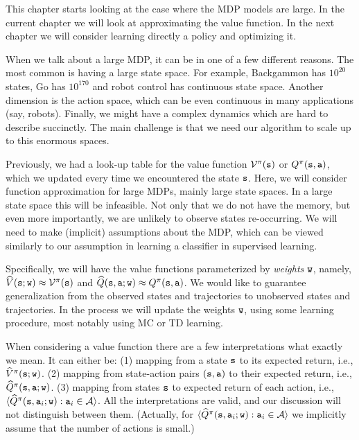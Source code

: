 This chapter starts looking at the case where the MDP models are
large. In the current chapter we will look at approximating the
value function. In the next chapter we will consider learning
directly a policy and optimizing it.

When we talk about a large MDP, it can be in one of a few different
reasons. The most common is having a large state space. For example,
Backgammon has $10^{20}$ states, Go has $10^{170}$ and robot control
has continuous state space. Another dimension is the action space,
which can be even continuous in many applications (say, robots).
Finally, we might have a complex dynamics which are hard to describe
succinctly. The main challenge is that we need our algorithm to
scale up to this enormous spaces.

 Previously, we had a look-up table for the value
function $\mathcal{V}^\pi({\tt s})$ or $Q^\pi({\tt s},{\tt a})$,
which we updated every time we encountered the state ${\tt s}$.
%
Here, we will consider function approximation for large MDPs, mainly
large state spaces.
%
In a large state space this will be infeasible. Not only that we do
not have the memory, but even more importantly, we are unlikely to
observe states re-occurring. We will need to make (implicit)
assumptions about the MDP, which can be viewed similarly to our
assumption in learning a classifier in supervised learning.

Specifically, we will have the value functions parameterized by {\em
weights} ${\tt w}$, namely, $\widehat{V}({\tt s};{\tt w})\approx
\mathcal{V}^\pi({\tt s})$ and
$\widehat{Q}({\tt s},{\tt a};{\tt w})\approx
Q^\pi({\tt s},{\tt a})$. We would like to guarantee
generalization from the observed states and trajectories to
unobserved states and trajectories. In the process we will update
the weights ${\tt w}$, using some learning procedure, most notably
using MC or TD learning.

When considering a value function there are a few interpretations
what exactly we mean. It can either be: (1) mapping from a state
${\tt s}$ to its expected return, i.e.,
$\widehat{V}^\pi({\tt s};{\tt w})$. (2) mapping from state-action
pairs $({\tt s},{\tt a})$ to their expected return, i.e.,
$\widehat{Q}^\pi({\tt s},{\tt a};{\tt w})$. (3) mapping from
states ${\tt s}$ to expected return of each action, i.e.,
$\langle\widehat{Q}^\pi({\tt s},{\tt a}_i;{\tt w}):{\tt a}_i\in
\mathcal{A}\rangle$. All the interpretations are valid, and our
discussion will not distinguish between them. (Actually, for
$\langle\widehat{Q}^\pi({\tt s},{\tt a}_i;{\tt w}):{\tt a}_i\in
\mathcal{A}\rangle$ we implicitly assume that the number of actions is
small.)

